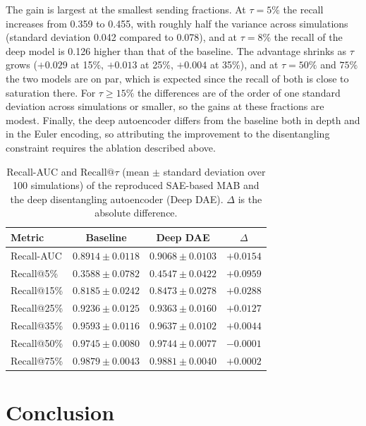 \documentclass[sigconf]{acmart}
\begin{document}
The gain is largest at the smallest sending fractions. At $\tau = 5\%$ the recall
increases from 0.359 to 0.455, with roughly half the variance across simulations
(standard deviation 0.042 compared to 0.078), and at $\tau = 8\%$ the recall of
the deep model is 0.126 higher than that of the baseline. The advantage
shrinks as $\tau$ grows ($+0.029$ at 15\%, $+0.013$ at 25\%, $+0.004$ at 35\%),
and at $\tau = 50\%$ and $75\%$ the two models are on par, which is expected
since the recall of both is close to saturation there. For $\tau \geq 15\%$ the
differences are of the order of one standard deviation across simulations or
smaller, so the gains at these fractions are modest. Finally, the deep
autoencoder differs from the baseline both in depth and in the Euler encoding,
so attributing the improvement to the disentangling constraint requires the
ablation described above.

\begin{table}[t]
  \caption{Recall-AUC and $\mathrm{Recall}@\tau$ (mean $\pm$ standard deviation
  over 100 simulations) of the reproduced SAE-based MAB and the deep
  disentangling autoencoder (Deep DAE). $\Delta$ is the absolute difference.}
  \label{tab:results}
  \small
  \begin{tabular}{@{}lccc@{}}
    \toprule
    Metric & Baseline & Deep DAE & $\Delta$ \\
    \midrule
    Recall-AUC & $0.8914 \pm 0.0118$ & $0.9068 \pm 0.0103$ & $+0.0154$ \\
    \midrule
    Recall@5\%  & $0.3588 \pm 0.0782$ & $0.4547 \pm 0.0422$ & $+0.0959$ \\
    Recall@15\% & $0.8185 \pm 0.0242$ & $0.8473 \pm 0.0278$ & $+0.0288$ \\
    Recall@25\% & $0.9236 \pm 0.0125$ & $0.9363 \pm 0.0160$ & $+0.0127$ \\
    Recall@35\% & $0.9593 \pm 0.0116$ & $0.9637 \pm 0.0102$ & $+0.0044$ \\
    Recall@50\% & $0.9745 \pm 0.0080$ & $0.9744 \pm 0.0077$ & $-0.0001$ \\
    Recall@75\% & $0.9879 \pm 0.0043$ & $0.9881 \pm 0.0040$ & $+0.0002$ \\
    \bottomrule
  \end{tabular}
\end{table}

\section{Conclusion}



\end{document}
